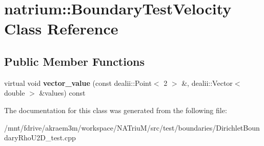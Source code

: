 \hypertarget{classnatrium_1_1BoundaryTestVelocity}{
\section{natrium::BoundaryTestVelocity Class Reference}
\label{classnatrium_1_1BoundaryTestVelocity}
}
\subsection*{Public Member Functions}
\begin{DoxyCompactItemize}
\item 
\hypertarget{classnatrium_1_1BoundaryTestVelocity_a79517bd2413986c38f4e944faea57a48}{
virtual void {\bfseries vector\_\-value} (const dealii::Point$<$ 2 $>$ \&, dealii::Vector$<$ double $>$ \&values) const }
\label{classnatrium_1_1BoundaryTestVelocity_a79517bd2413986c38f4e944faea57a48}

\end{DoxyCompactItemize}


The documentation for this class was generated from the following file:\begin{DoxyCompactItemize}
\item 
/mnt/fdrive/akraem3m/workspace/NATriuM/src/test/boundaries/DirichletBoundaryRhoU2D\_\-test.cpp\end{DoxyCompactItemize}
